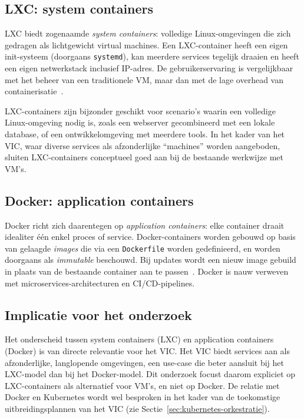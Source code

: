 \subsection{LXC: system containers}
\label{subsec:lxc-system-containers}

LXC biedt zogenaamde \textit{system containers}: volledige Linux-omgevingen die zich gedragen als lichtgewicht virtual machines. Een LXC-container heeft een eigen init-systeem (doorgaans \texttt{systemd}), kan meerdere services tegelijk draaien en heeft een eigen netwerkstack inclusief IP-adres. De gebruikerservaring is vergelijkbaar met het beheer van een traditionele VM, maar dan met de lage overhead van containerisatie~\autocite{Soltesz2007}.

LXC-containers zijn bijzonder geschikt voor scenario's waarin een volledige Linux-omgeving nodig is, zoals een webserver gecombineerd met een lokale database, of een ontwikkelomgeving met meerdere tools. In het kader van het VIC, waar diverse services als afzonderlijke ``machines'' worden aangeboden, sluiten LXC-containers conceptueel goed aan bij de bestaande werkwijze met VM's.

\subsection{Docker: application containers}
\label{subsec:docker-application-containers}

Docker richt zich daarentegen op \textit{application containers}: elke container draait idealiter één enkel proces of service. Docker-containers worden gebouwd op basis van gelaagde \textit{images} die via een \texttt{Dockerfile} worden gedefinieerd, en worden doorgaans als \textit{immutable} beschouwd. Bij updates wordt een nieuw image gebuild in plaats van de bestaande container aan te passen~\autocite{Merkel2014}. Docker is nauw verweven met microservices-architecturen en CI/CD-pipelines.

\subsection{Implicatie voor het onderzoek}
\label{subsec:implicatie-lxc-docker}

Het onderscheid tussen system containers (LXC) en application containers (Docker) is van directe relevantie voor het VIC. Het VIC biedt services aan als afzonderlijke, langlopende omgevingen, een use-case die beter aansluit bij het LXC-model dan bij het Docker-model. Dit onderzoek focust daarom expliciet op LXC-containers als alternatief voor VM's, en niet op Docker. De relatie met Docker en Kubernetes wordt wel besproken in het kader van de toekomstige uitbreidingsplannen van het VIC (zie Sectie~\ref{sec:kubernetes-orkestratie}).

